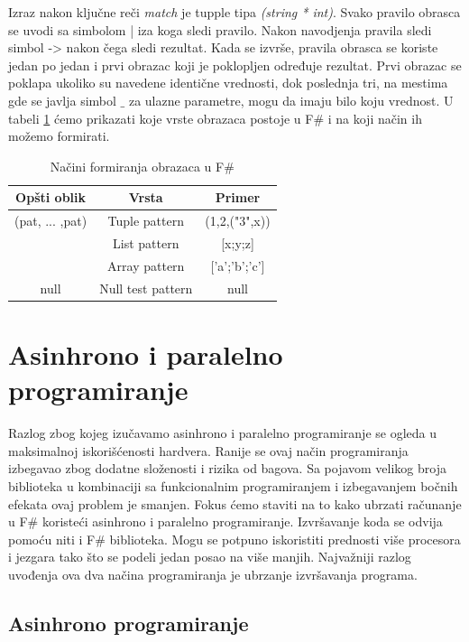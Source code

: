 \documentclass[a4paper]{article}
\begin{document}
Izraz nakon ključne reči {\em match} je tupple tipa {\em (string * int)}. Svako pravilo obrasca se uvodi sa simbolom | iza koga sledi pravilo. Nakon navodjenja pravila sledi simbol -> nakon čega sledi rezultat. Kada se izvrše, pravila obrasca se koriste jedan po jedan i prvi obrazac koji je poklopljen određuje rezultat. Prvi obrazac se poklapa ukoliko su navedene identične vrednosti, dok poslednja tri, na mestima gde se javlja simbol $\_$ za ulazne parametre, mogu da imaju bilo koju vrednost. U tabeli \ref{tab:tabela1} ćemo prikazati koje vrste obrazaca postoje u F\# i na koji način ih možemo formirati.
 
\begin{table}[h!]
\begin{center}
\caption{Načini formiranja obrazaca u F\#}
\begin{tabular}{|c|c|c|} \hline
\textbf{Opšti oblik}& \textbf{Vrsta}& \textbf{Primer}\\ \hline
(pat, ... ,pat) &Tuple pattern&(1,2,("3",x))
\\ \hline
[pat, ... ,pat] &List pattern&[x;y;z]\\ \hline
[|pat, ... ,pat|] &Array pattern&['a';'b';'c']\\ \hline
null &Null test pattern&null\\ \hline
\end{tabular}
\label{tab:tabela1}
\end{center}
\end{table}


\section{Asinhrono i paralelno programiranje}

Razlog zbog kojeg izučavamo asinhrono i paralelno programiranje se ogleda u maksimalnoj iskorišćenosti hardvera. Ranije se ovaj način programiranja izbegavao zbog dodatne složenosti i rizika od bagova. Sa pojavom velikog broja biblioteka u kombinaciji sa funkcionalnim programiranjem i izbegavanjem bočnih efekata ovaj problem je smanjen. Fokus ćemo staviti na to kako ubrzati računanje u F\# koristeći asinhrono i paralelno programiranje. Izvršavanje koda se odvija pomoću niti i F\# biblioteka. Mogu se potpuno iskoristiti prednosti više procesora i jezgara tako što se podeli jedan posao na više manjih. Najvažniji razlog uvođenja ova dva načina programiranja je ubrzanje izvršavanja programa.


\subsection{Asinhrono programiranje} 
\end{document}
